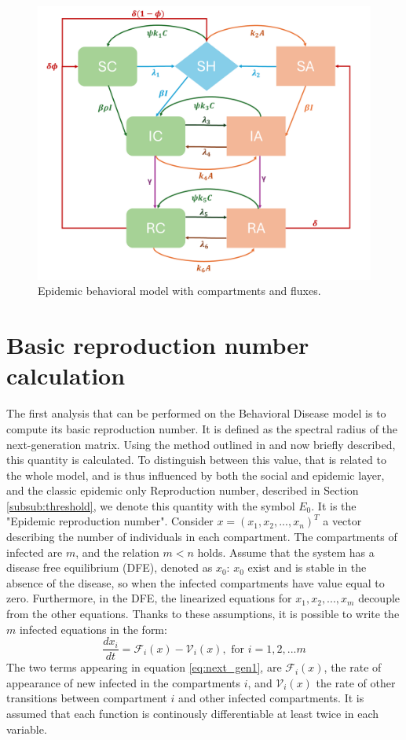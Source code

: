 \begin{figure}
	\centering
	\includegraphics[height=0.8\linewidth]{1_corpo/figure/model_SAHCIR}
	\caption[Epidemic behavior model]{Epidemic behavioral model with compartments and fluxes.}
	\label{fig:epibehaviourmodelfigure}
\end{figure}

\section{Basic reproduction number calculation}
The first analysis that can be performed on the Behavioral Disease model is to compute its basic reproduction number. It is defined as the spectral radius of the next-generation matrix. Using the method outlined in \cite{van_den_Driessche_2017} and now briefly described, this quantity is calculated. To distinguish between this value, that is related to the whole model, and is thus influenced by both the social and epidemic layer, and the classic epidemic only Reproduction number, described in Section \ref{subsub:threshold}, we denote this quantity with the symbol $E_0$. It is the "Epidemic reproduction number". 
Consider $x = (x_1,x_2,...,x_n)^T$ a vector describing the number of individuals in each compartment. The compartments of infected are $m$, and the relation $m < n$ holds. 
Assume that the system has a disease free equilibrium (DFE), denoted as $x_0$: $x_0$ exist and is stable in the absence of the disease, so when the infected compartments have value equal to zero. Furthermore, in the DFE, the linearized equations for $x_1,x_2,...,x_m$ decouple from the other equations. Thanks to these assumptions, it is possible to write the $m$ infected equations in the form:
\begin{equation}
\label{eq:next_gen1}
\frac{dx_i}{dt} = \mathcal{F}_i(x) - \mathcal{V}_i(x), \text{ for } i =1,2,...m
\end{equation}
The two terms appearing in equation \eqref{eq:next_gen1}, are $\mathcal{F}_i(x)$, the rate of appearance of new infected in the compartments $i$, and $ \mathcal{V}_i(x)$ the rate of other transitions between compartment $i$ and other infected compartments. It is assumed that each function is continously differentiable at least twice in each variable.

